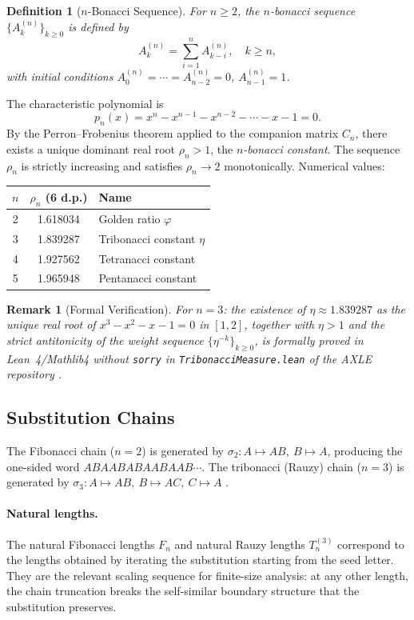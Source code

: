 \documentclass[12pt,a4paper]{article}
\newtheorem{definition}{Definition}
\newtheorem{remark}{Remark}
\begin{document}
\begin{definition}[$n$-Bonacci Sequence]
For $n \geq 2$, the $n$-bonacci sequence $\{A_k^{(n)}\}_{k \geq 0}$ is
defined by
\[
  A_k^{(n)} = \sum_{i=1}^{n} A_{k-i}^{(n)}, \quad k \geq n,
\]
with initial conditions $A_0^{(n)} = \cdots = A_{n-2}^{(n)} = 0$,
$A_{n-1}^{(n)} = 1$.
\end{definition}

The characteristic polynomial is
\[
  p_n(x) = x^n - x^{n-1} - x^{n-2} - \cdots - x - 1 = 0.
\]
By the Perron--Frobenius theorem applied to the companion matrix $C_n$,
there exists a unique dominant real root $\rho_n > 1$, the
\emph{$n$-bonacci constant}. The sequence $\rho_n$ is strictly increasing
and satisfies $\rho_n \to 2$ monotonically. Numerical values:

\begin{center}
\begin{tabular}{ccl}
\toprule
$n$ & $\rho_n$ (6 d.p.) & Name \\
\midrule
2 & 1.618034 & Golden ratio $\varphi$ \\
3 & 1.839287 & Tribonacci constant $\eta$ \\
4 & 1.927562 & Tetranacci constant \\
5 & 1.965948 & Pentanacci constant \\
\bottomrule
\end{tabular}
\end{center}

\begin{remark}[Formal Verification]
For $n = 3$: the existence of $\eta \approx 1.839287$ as the unique real root
of $x^3 - x^2 - x - 1 = 0$ in $[1,2]$, together with $\eta > 1$ and the
strict antitonicity of the weight sequence $\{\eta^{-k}\}_{k \geq 0}$, is
formally proved in Lean~4/Mathlib4 without \texttt{sorry} in
\texttt{TribonacciMeasure.lean} of the AXLE repository \cite{AXLE2026}.
\end{remark}

\subsection{Substitution Chains}

The Fibonacci chain ($n=2$) is generated by $\sigma_2: A \mapsto AB,\ B \mapsto A$,
producing the one-sided word $ABAABABAABAAB\cdots$. The tribonacci (Rauzy)
chain ($n=3$) is generated by $\sigma_3: A \mapsto AB,\ B \mapsto AC,\
C \mapsto A$ \cite{Krebbekx2023,Rauzy1982}.

\paragraph{Natural lengths.} The natural Fibonacci lengths $F_n$ and natural
Rauzy lengths $T_n^{(3)}$ correspond to the lengths obtained by iterating
the substitution starting from the seed letter. They are the relevant
scaling sequence for finite-size analysis: at any other length, the chain
truncation breaks the self-similar boundary structure that the substitution
preserves.
\end{document}
